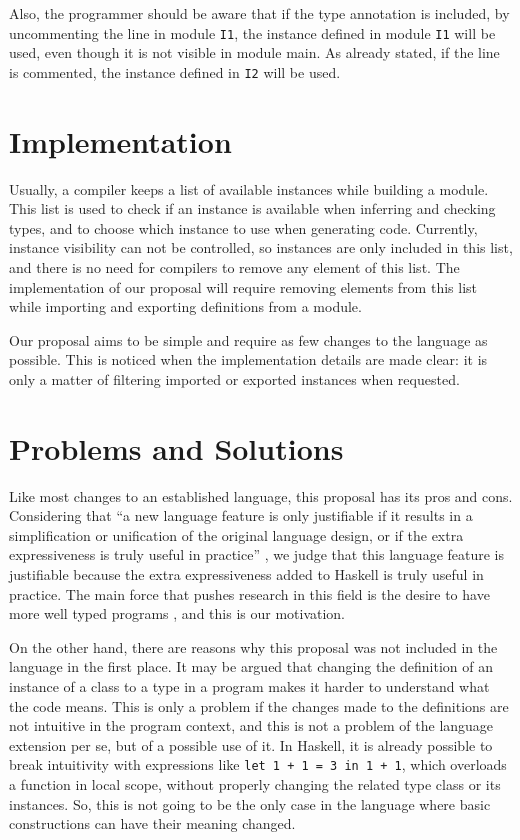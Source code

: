 \documentclass[msc]{ppgccufmg}
\begin{document}
Also, the programmer should be aware that if the type annotation is
included, by uncommenting the line in module \texttt{I1}, the instance
defined in module \texttt{I1} will be used, even though it is not
visible in module main.  As already stated, if the line is commented,
the instance defined in \texttt{I2} will be used.

\section{Implementation}
Usually, a compiler keeps a list of available instances while building a
module.  This list is used to check if an instance is available when inferring and
checking types, and to choose which instance to use when generating code.
Currently, instance visibility can not be controlled, so instances are only
included in this list, and there is no need for compilers to remove any element
of this list.  The implementation of our proposal will require removing
elements from this list while importing and exporting definitions from a module.

Our proposal aims to be simple and require as few changes to the
language as possible. This is noticed when the implementation details
are made clear: it is only a matter of filtering imported or exported
instances when requested.

\section{Problems and Solutions}
Like most changes to an established language, this proposal has
its pros and cons.  Considering that ``a new language feature is only
justifiable if it results in a simplification or unification of the
original language design, or if the extra expressiveness is truly
useful in practice'' \citep[p.~1]{tc}, we judge that this language
feature is justifiable because the extra expressiveness added to
Haskell is truly useful in practice.  The main force that pushes
research in this field is the desire to have more well typed programs
\citep[p.~3]{pierce}, and this is our motivation.

On the other hand, there are reasons why this proposal was not included in the
language in the first place.  
It may be argued that changing the definition of
an instance of a class to a type in a program makes it harder to understand
what the code means.  
This is only a problem if the changes made to the
definitions are not intuitive in the program context, and this is not a problem
of the language extension per se, but of a possible use of it.  In Haskell,
it is already possible to break intuitivity with expressions like \texttt{let 1 + 1 = 3
in 1 + 1}, which overloads a function in local scope, without properly changing
the related type class or its instances.  So, this is not going to be the only
case in the language where basic constructions can have their meaning changed.
\end{document}
